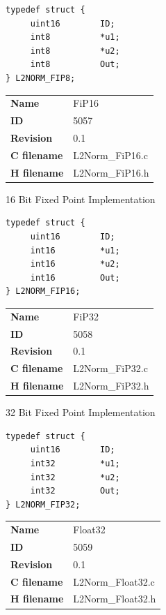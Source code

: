 \begin{lstlisting}
typedef struct {
     uint16        ID;
     int8          *u1;
     int8          *u2;
     int8          Out;
} L2NORM_FIP8;
\end{lstlisting}

\ifdefined \AddTestReports
{}
\fi
{}
\nopagebreak[0]
\begin{tabular}{l l}
\textbf{Name} & FiP16 \tabularnewline
\textbf{ID} & 5057 \tabularnewline
\textbf{Revision} & 0.1 \tabularnewline
\textbf{C filename} & L2Norm\_FiP16.c \tabularnewline
\textbf{H filename} & L2Norm\_FiP16.h \tabularnewline
\end{tabular}
\vspace{1ex}

16 Bit Fixed Point Implementation

\begin{lstlisting}
typedef struct {
     uint16        ID;
     int16         *u1;
     int16         *u2;
     int16         Out;
} L2NORM_FIP16;
\end{lstlisting}

\ifdefined \AddTestReports
{}
\fi
{}
\nopagebreak[0]
\begin{tabular}{l l}
\textbf{Name} & FiP32 \tabularnewline
\textbf{ID} & 5058 \tabularnewline
\textbf{Revision} & 0.1 \tabularnewline
\textbf{C filename} & L2Norm\_FiP32.c \tabularnewline
\textbf{H filename} & L2Norm\_FiP32.h \tabularnewline
\end{tabular}
\vspace{1ex}

32 Bit Fixed Point Implementation

\begin{lstlisting}
typedef struct {
     uint16        ID;
     int32         *u1;
     int32         *u2;
     int32         Out;
} L2NORM_FIP32;
\end{lstlisting}

\ifdefined \AddTestReports
{}
\fi
{}
\nopagebreak[0]
\begin{tabular}{l l}
\textbf{Name} & Float32 \tabularnewline
\textbf{ID} & 5059 \tabularnewline
\textbf{Revision} & 0.1 \tabularnewline
\textbf{C filename} & L2Norm\_Float32.c \tabularnewline
\textbf{H filename} & L2Norm\_Float32.h \tabularnewline
\end{tabular}
\vspace{1ex}


